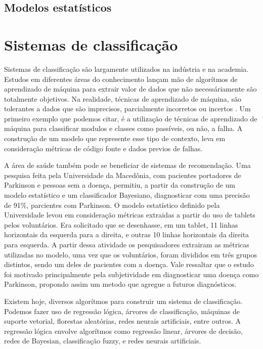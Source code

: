 \section{Modelos estatísticos}

\chapter{Sistemas de classificação}
Sistemas de classificação são largamente utilizados na indústria e na academia. Estudos em diferentes áreas do conhecimento
lançam mão de algorítmos de aprendizado de máquina para extrair valor de dados que não necessáriamente são totalmente objetivos. Na realidade,
técnicas de aprendizado de máquina, são tolerantes a dados que são imprecisos, parcialmente incorretos ou incertos \cite{Malhotra}. Um primeiro
exemplo que podemos citar, é a utilização de técnicas de aprendizado de máquina para classificar modulos e classes como passíveis, ou não, a falha\cite{Malhotra}.  A construção de um modelo que represente esse tipo de contexto, leva em consideração métricas de código fonte e dados previos de falhas\cite{Malhotra}.

A área de saúde também pode se beneficiar de sistemas de recomendação. Uma pesquisa feita pela Universidade da Macedônia,  com pacientes portadores de Parkinson e pessoas sem a doença, permitiu, a partir da construção de um modelo estatístico e um classificador Bayesiano, diagnosticar com uma precisão de 91\%, parcientes com Parkinson\cite{Kotsavasiloglou}. O modelo estatístico definido pela Universidade levou em consideração métricas extraidas a partir do uso de tablets pelos voluntários. Era solicitado que se desenhasse, em um tablet, 11 linhas horizontais da esquerda para a direita, e outras 10 linhas horizontais da direita para esquerda. A partir dessa atividade os pesquisadores extrairam as métricas utilizadas no modelo, uma vez que os voluntários, foram divididos em três grupos distintos, sendo um deles de pacientes com a doença. Vale ressaltar que o estudo foi motivado principalmente pela subjetividade em diagnosticar uma doença como Parkinson, propondo assim um metodo que agregue a futuros diagnósticos.

Existem hoje, diversos algorítmos para construir um sistema de classificação. Podemos fazer uso de regressão lógica, árvores de classificação, máquinas de suporte vetorial, florestas aleatórias, redes neurais artificiais, entre outros.
A regressão lógica envolve algorítmos como regressão linear, árvores de decisão, redes de Bayesian, classificação fuzzy, e redes neurais artificiais\cite{Louridas}.

